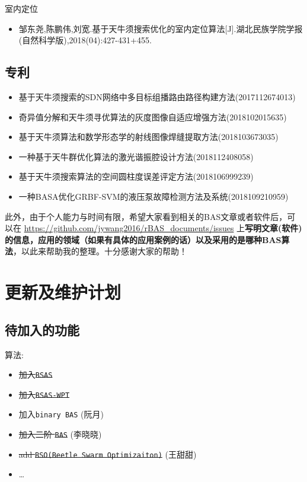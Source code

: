 \documentclass[]{ctexbook}
\providecommand{\tightlist}{%
  \setlength{\itemsep}{0pt}\setlength{\parskip}{0pt}}
\begin{document}
室内定位

\begin{itemize}
\tightlist
\item
  邹东尧,陈鹏伟,刘宽.基于天牛须搜索优化的室内定位算法{[}J{]}.湖北民族学院学报(自然科学版),2018(04):427-431+455.
\end{itemize}

\section{专利}

\begin{itemize}
\tightlist
\item
  基于天牛须搜索的SDN网络中多目标组播路由路径构建方法(2017112674013)
\item
  奇异值分解和天牛须寻优算法的灰度图像自适应增强方法(2018102015635)
\item
  基于天牛须算法和数学形态学的射线图像焊缝提取方法(2018103673035)
\item
  一种基于天牛群优化算法的激光谐振腔设计方法(2018112408058)
\item
  基于天牛须搜索算法的空间圆柱度误差评定方法(2018106999239)
\item
  一种BASA优化GRBF-SVM的液压泵故障检测方法及系统(2018109210959)
\end{itemize}

此外，由于个人能力与时间有限，希望大家看到相关的BAS文章或者软件后，可以在
\url{https://github.com/jywang2016/rBAS_documents/issues}
上\textbf{写明文章(软件)的信息，应用的领域（如果有具体的应用案例的话）以及采用的是哪种BAS算法}，以此来帮助我的整理。十分感谢大家的帮助！

\chapter{更新及维护计划}\label{updates}

\section{待加入的功能}

算法:

\begin{itemize}
\tightlist
\item
  \sout{加入\texttt{BSAS}}
\item
  \sout{加入\texttt{BSAS-WPT}}
\item
  加入\texttt{binary\ BAS} (阮月)
\item
  \sout{加入二阶 \texttt{BAS}} (李晓晓)
\item
  \sout{add \texttt{BSO(Beetle\ Swarm\ Optimizaiton)}} (王甜甜)
\item
  \ldots{}
\end{itemize}
\end{document}

